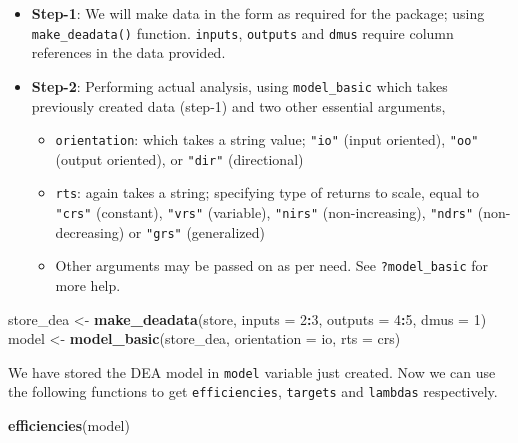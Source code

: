 \documentclass[
]{book}
\newenvironment{Shaded}{\begin{snugshade}}{\end{snugshade}}
\newcommand{\AttributeTok}[1]{\textcolor[rgb]{0.13,0.29,0.53}{#1}}
\newcommand{\DecValTok}[1]{\textcolor[rgb]{0.00,0.00,0.81}{#1}}
\newcommand{\FunctionTok}[1]{\textcolor[rgb]{0.13,0.29,0.53}{\textbf{#1}}}
\newcommand{\NormalTok}[1]{#1}
\newcommand{\OtherTok}[1]{\textcolor[rgb]{0.56,0.35,0.01}{#1}}
\newcommand{\SpecialCharTok}[1]{\textcolor[rgb]{0.81,0.36,0.00}{\textbf{#1}}}
\newcommand{\StringTok}[1]{\textcolor[rgb]{0.31,0.60,0.02}{#1}}
\providecommand{\tightlist}{%
  \setlength{\itemsep}{0pt}\setlength{\parskip}{0pt}}
\begin{document}
\begin{itemize}
\tightlist
\item
  \textbf{Step-1}: We will make data in the form as required for the package; using \texttt{make\_deadata()} function. \texttt{inputs}, \texttt{outputs} and \texttt{dmus} require column references in the data provided.
\item
  \textbf{Step-2}: Performing actual analysis, using \texttt{model\_basic} which takes previously created data (step-1) and two other essential arguments,

  \begin{itemize}
  \tightlist
  \item
    \texttt{orientation}: which takes a string value; \texttt{"io"} (input oriented), \texttt{"oo"} (output oriented), or \texttt{"dir"} (directional)
  \item
    \texttt{rts}: again takes a string; specifying type of returns to scale, equal to \texttt{"crs"} (constant), \texttt{"vrs"} (variable), \texttt{"nirs"} (non-increasing), \texttt{"ndrs"} (non-decreasing) or \texttt{"grs"} (generalized)
  \item
    Other arguments may be passed on as per need. See \texttt{?model\_basic} for more help.
  \end{itemize}
\end{itemize}

\begin{Shaded}
\begin{Highlighting}[]
\NormalTok{store\_dea }\OtherTok{\textless{}{-}} \FunctionTok{make\_deadata}\NormalTok{(store, }\AttributeTok{inputs =} \DecValTok{2}\SpecialCharTok{:}\DecValTok{3}\NormalTok{, }\AttributeTok{outputs =} \DecValTok{4}\SpecialCharTok{:}\DecValTok{5}\NormalTok{, }\AttributeTok{dmus =} \DecValTok{1}\NormalTok{)}
\NormalTok{model }\OtherTok{\textless{}{-}} \FunctionTok{model\_basic}\NormalTok{(store\_dea, }\AttributeTok{orientation =} \StringTok{\textquotesingle{}io\textquotesingle{}}\NormalTok{, }\AttributeTok{rts =} \StringTok{\textquotesingle{}crs\textquotesingle{}}\NormalTok{)}
\end{Highlighting}
\end{Shaded}

We have stored the DEA model in \texttt{model} variable just created. Now we can use the following functions to get \texttt{efficiencies}, \texttt{targets} and \texttt{lambdas} respectively.

\begin{Shaded}
\begin{Highlighting}[]
\FunctionTok{efficiencies}\NormalTok{(model)}
\end{Highlighting}
\end{Shaded}
\end{document}
